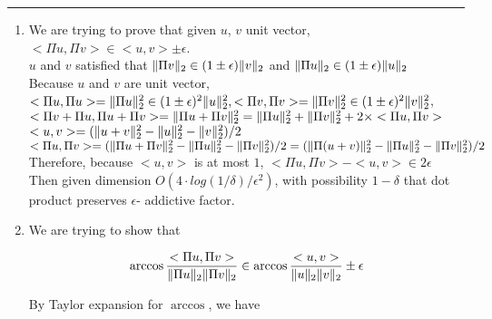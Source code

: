 \documentclass[11pt]{article}
\begin{document}




\begin{quote}

\end{quote}
\hrule


\begin{solution}
\item
\begin{enumerate}
    \item 
    We are trying to prove that given $u$, $v$ unit vector, $<\Pi u, \Pi v> \in <u, v> \pm\epsilon$. \\
    
    $u$ and $v$ satisfied that $\mathopen\| \Pi v \mathclose\|_2 \in (1\pm\epsilon)\mathopen\| v \mathclose\|_2$ and $\mathopen\| \Pi u \mathclose\|_2 \in (1\pm\epsilon)\mathopen\| u \mathclose\|_2$  \\
    
    Because $u$ and $v$ are unit vector, $<\Pi u, \Pi u> = \mathopen\| \Pi u \mathclose\|_2^2 \in (1\pm\epsilon)^2\mathopen\| u \mathclose\|_2^2 ,<\Pi v, \Pi v> = \mathopen\| \Pi v \mathclose\|_2^2 \in (1\pm\epsilon)^2\mathopen\| v \mathclose\|_2^2 $, $<\Pi v + \Pi u, \Pi u + \Pi v> = \mathopen\| \Pi u + \Pi v \mathclose\|_2^2 = \mathopen\| \Pi u \mathclose\|_2^2 + \mathopen\| \Pi v \mathclose\|_2^2 + 2 \times <\Pi u,\Pi v>$ \\
    
    $<u,v> = (\mathopen\| u+v \mathclose\|_2^2 - \mathopen\| u \mathclose\|_2^2 - \mathopen\| v \mathclose\|_2^2)/2$\\
    $<\Pi u, \Pi v> = (\mathopen\| \Pi u + \Pi v \mathclose\|_2^2 - \mathopen\| \Pi u \mathclose\|_2^2 - \mathopen\| \Pi v \mathclose\|_2^2)/2 = (\mathopen\| \Pi (u + v) \mathclose\|_2^2 - \mathopen\| \Pi u \mathclose\|_2^2 - \mathopen\| \Pi v \mathclose\|_2^2)/2$\\
    
    Therefore, because $<u,v>$ is at most $1$, $<\Pi u, \Pi v> - <u,v> \in 2\epsilon$ \\
    
    Then given dimension $O(4\cdot log(1/\delta)/\epsilon^2)$, with possibility $1-\delta$ that dot product preserves $\epsilon$- addictive factor. 

    \item We are trying to show that 
    
    $$\arccos\frac{<\Pi u, \Pi v>}{\mathopen\| \Pi u \mathclose\|_2\mathopen\| \Pi v \mathclose\|_2} \in \arccos\frac{<u, v>}{\mathopen\| u \mathclose\|_2\mathopen\| v \mathclose\|_2} \pm\epsilon$$

    By Taylor expansion for $\arccos$, we have 
    

\end{enumerate}
\end{solution}
\end{document}
